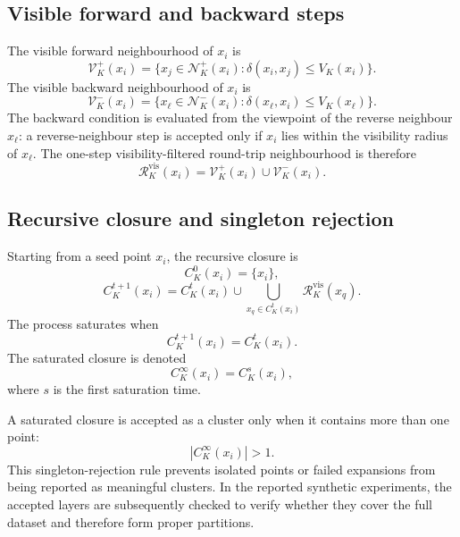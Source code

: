 \documentclass[pdflatex,sn-mathphys-num]{sn-jnl}
\newcommand{\calN}{\mathcal{N}}
\newcommand{\calR}{\mathcal{R}}
\newcommand{\calV}{\mathcal{V}}
\begin{document}
\subsection{Visible forward and backward steps}

The visible forward neighbourhood of $x_i$ is
\begin{equation}
\calV_K^+(x_i)=
\{x_j\in\calN_K^+(x_i):\delta(x_i,x_j)\leq V_K(x_i)\}.
\label{eq:visible_forward}
\end{equation}
The visible backward neighbourhood of $x_i$ is
\begin{equation}
\calV_K^-(x_i)=
\{x_\ell\in\calN_K^-(x_i):\delta(x_\ell,x_i)\leq V_K(x_\ell)\}.
\label{eq:visible_backward}
\end{equation}
The backward condition is evaluated from the viewpoint of the reverse neighbour $x_\ell$: a reverse-neighbour step is accepted only if $x_i$ lies within the visibility radius of $x_\ell$. The one-step visibility-filtered round-trip neighbourhood is therefore
\begin{equation}
\calR_K^{\mathrm{vis}}(x_i)=\calV_K^+(x_i)\cup\calV_K^-(x_i).
\label{eq:visible_roundtrip}
\end{equation}

\subsection{Recursive closure and singleton rejection}

Starting from a seed point $x_i$, the recursive closure is
\begin{equation}
C_K^0(x_i)=\{x_i\},
\end{equation}
\begin{equation}
C_K^{t+1}(x_i)=C_K^t(x_i)\cup
\bigcup_{x_q\in C_K^t(x_i)}\calR_K^{\mathrm{vis}}(x_q).
\label{eq:visibility_closure}
\end{equation}
The process saturates when
\begin{equation}
C_K^{t+1}(x_i)=C_K^t(x_i).
\end{equation}
The saturated closure is denoted
\begin{equation}
C_K^\infty(x_i)=C_K^s(x_i),
\end{equation}
where $s$ is the first saturation time.

A saturated closure is accepted as a cluster only when it contains more than one point:
\begin{equation}
|C_K^\infty(x_i)|>1.
\label{eq:singleton_rejection}
\end{equation}
This singleton-rejection rule prevents isolated points or failed expansions from being reported as meaningful clusters. In the reported synthetic experiments, the accepted layers are subsequently checked to verify whether they cover the full dataset and therefore form proper partitions.
\end{document}
